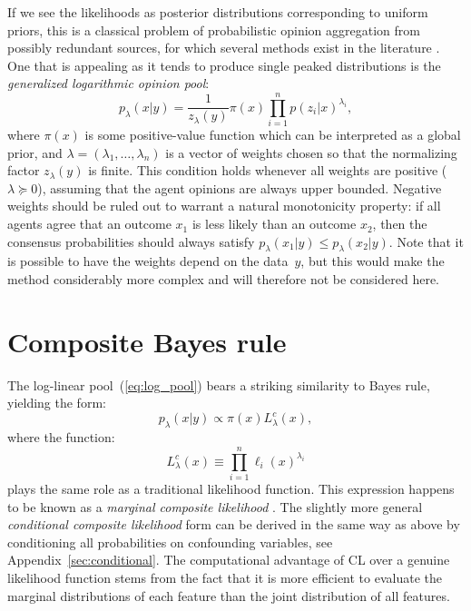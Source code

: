 \documentclass[english]{scrartcl}
\begin{document}
If we see the likelihoods as posterior distributions corresponding to uniform priors, this is a classical problem of probabilistic opinion aggregation from possibly redundant sources, for which several methods exist in the literature \cite{Tarantola-82,Genest-86,Garg-04,Allard-12}. One that is appealing as it tends to produce single peaked distributions is the {\em generalized logarithmic opinion pool}:
\begin{equation}
\label{eq:log_pool}
p_\lambda(x|y) = \frac{1}{z_\lambda(y)} \pi(x) \prod_{i=1}^n p(z_i|x)^{\lambda_i},
\end{equation} 
where $\pi(x)$ is some positive-value function which can be interpreted as a global prior, and $\lambda=(\lambda_1,\ldots,\lambda_n)$ is a vector of weights chosen so that the normalizing factor $z_\lambda(y)$ is finite. This condition holds whenever all weights are positive ($\lambda\succeq 0$), assuming that the agent opinions are always upper bounded. Negative weights should be ruled out to warrant a natural monotonicity property: if all agents agree that an outcome $x_1$ is less likely than an outcome $x_2$, then the consensus probabilities should always satisfy $p_\lambda(x_1|y)\leq p_\lambda(x_2|y)$. Note that it is possible to have the weights depend on the data~$y$, but this would make the method considerably more complex and will therefore not be considered here.





\section{Composite Bayes rule}
\label{sec:bayes_rule}

The log-linear pool~(\ref{eq:log_pool}) bears a striking similarity to Bayes rule, yielding  the form: 
$$
p_\lambda(x|y)\propto \pi(x) L^c_\lambda(x),
$$
where the function:
\begin{equation}
\label{eq:comp_lik}
L^c_\lambda(x) \equiv \prod_{i=1}^n \ell_i (x)^{\lambda_i}
\end{equation} 
plays the same role as a traditional likelihood function. This expression happens to be known as a {\em marginal composite likelihood} \cite{Varin-11}. The slightly more general {\em conditional composite likelihood} form can be derived in the same way as above by conditioning all probabilities on confounding variables, see Appendix~\ref{sec:conditional}. The computational advantage of CL over a genuine likelihood function stems from the fact that it is more efficient to evaluate the marginal distributions of each feature  than the joint distribution of all features.
\end{document}
